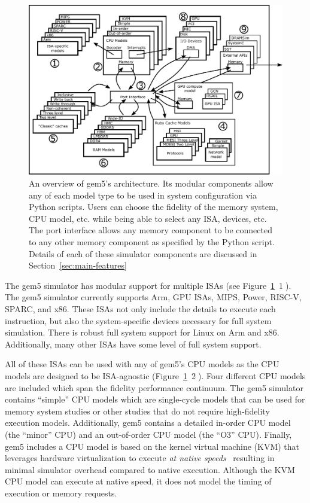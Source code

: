 \begin{figure}
  \centering
  \includegraphics[width=\textwidth]{fig/gem5-big-picture}
  \caption{An overview of gem5's architecture. Its modular components allow any of each model type to be used in system configuration via Python scripts. Users can choose the fidelity of the memory system, CPU model, etc. while being able to select any ISA, devices, etc. The port interface allows any memory component to be connected to any other memory component as specified by the Python script. Details of each of these simulator components are discussed in Section~\ref{sec:main-features}}
  \label{fig:gem5-big-picture}
\end{figure}

The gem5 simulator has modular support for multiple ISAs (see Figure~\ref{fig:gem5-big-picture}~\textcircled{1}).
The gem5 simulator currently supports Arm, GPU ISAs, MIPS, Power, RISC-V, SPARC, and x86.
These ISAs not only include the details to execute each instruction, but also the system-specific devices necessary for full system simulation.
There is robust full system support for Linux on Arm and x86.
Additionally, many other ISAs have some level of full system support.

All of these ISAs can be used with any of gem5's CPU models as the CPU models are designed to be ISA-agnostic (Figure~\ref{fig:gem5-big-picture}~\textcircled{2}).
Four different CPU models are included which span the fidelity performance continuum.
The gem5 simulator contains ``simple'' CPU models which are single-cycle models that can be used for memory system studies or other studies that do not require high-fidelity execution models.
Additionally, gem5 contains a detailed in-order CPU model (the ``minor'' CPU) and an out-of-order CPU model (the ``O3'' CPU).
Finally, gem5 includes a CPU model is based on the kernel virtual machine (KVM) that leverages hardware virtualization to execute \emph{at native speeds}~\cite{full-speed-ahead} resulting in minimal simulator overhead compared to native execution.
Although the KVM CPU model can execute at native speed, it does not model the timing of execution or memory requests.


